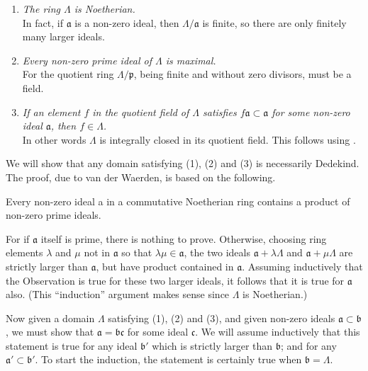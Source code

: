 \begin{enumerate}
	\item \textit{The ring $\Lambda$ is Noetherian.}\\
	In fact, if $\mathfrak{a}$ is a non-zero ideal, then $\Lambda / \mathfrak{a}$ is finite, so there are only finitely many larger ideals.
\item \textit{Every non-zero prime ideal of $\Lambda$ is maximal.}\\
	For the quotient ring $\Lambda / \mathfrak{p}$, being finite and without zero divisors, must be a field.
\item \textit{If an element $f$ in the quotient field of $\Lambda$ satisfies $f \mathfrak{a} \subset \mathfrak{a}$ for some non-zero ideal $\mathfrak{a}$, then $f \in \Lambda$.}\\
	In other words $\Lambda$ is integrally closed in its quotient field. This follows using .
\end{enumerate}

We will show that any domain satisfying (1), (2) and (3) is necessarily Dedekind. The proof, due to van der Waerden, is based on the following.

\begin{obs}
	Every non-zero ideal a in a commutative Noetherian ring contains a product of non-zero prime ideals.
\end{obs}

For if $\mathfrak{a}$ itself is prime, there is nothing to prove. Otherwise, choosing ring elements $\lambda$ and $\mu$ not in $\mathfrak{a}$ so that $\lambda \mu \in \mathfrak{a}$, the two ideals $\mathfrak{a}+\lambda \Lambda$ and $\mathfrak{a}+\mu \Lambda$ are strictly larger than $\mathfrak{a}$, but have product contained in $\mathfrak{a}$. Assuming inductively that the Observation is true for these two larger ideals, it follows that it is true for $\mathfrak{a}$ also. (This ``induction'' argument makes sense since $\Lambda$ is Noetherian.)

Now given a domain $\Lambda$ satisfying (1), (2) and (3), and given non-zero ideals $\mathfrak{a} \subset \mathfrak{b}$, we must show that $\mathfrak{a}=\mathfrak{b} \mathfrak{c}$ for some ideal $\mathfrak{c}$. We will assume inductively that this statement is true for any ideal $\mathfrak{b}'$ which is strictly larger than $\mathfrak{b}$; and for any $\mathfrak{a}' \subset \mathfrak{b}'$. To start the induction, the statement is certainly true when $\mathfrak{b}=\Lambda$.

